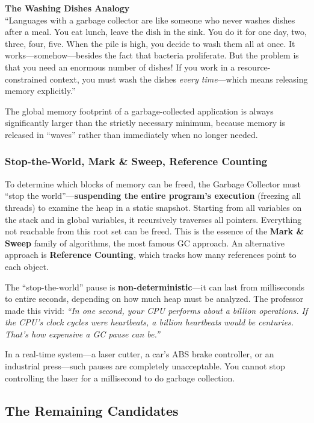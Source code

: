 \begin{insightbox}
\textbf{The Washing Dishes Analogy} \\
``Languages with a garbage collector are like someone who never washes dishes after a meal. You eat lunch, leave the dish in the sink. You do it for one day, two, three, four, five. When the pile is high, you decide to wash them all at once. It works---somehow---besides the fact that bacteria proliferate. But the problem is that you need an enormous number of dishes! If you work in a resource-constrained context, you must wash the dishes \emph{every time}---which means releasing memory explicitly.''
\end{insightbox}

The global memory footprint of a garbage-collected application is always significantly larger than the strictly necessary minimum, because memory is released in ``waves'' rather than immediately when no longer needed.

\subsubsection{Stop-the-World, Mark \& Sweep, Reference Counting}

To determine which blocks of memory can be freed, the Garbage Collector must ``stop the world''---\textbf{suspending the entire program's execution} (freezing all threads) to examine the heap in a static snapshot. Starting from all variables on the stack and in global variables, it recursively traverses all pointers. Everything not reachable from this root set can be freed. This is the essence of the \textbf{Mark \& Sweep} family of algorithms, the most famous GC approach. An alternative approach is \textbf{Reference Counting}, which tracks how many references point to each object.

The ``stop-the-world'' pause is \textbf{non-deterministic}---it can last from milliseconds to entire seconds, depending on how much heap must be analyzed. The professor made this vivid: \emph{``In one second, your CPU performs about a billion operations. If the CPU's clock cycles were heartbeats, a billion heartbeats would be centuries. That's how expensive a GC pause can be.''}

In a real-time system---a laser cutter, a car's ABS brake controller, or an industrial press---such pauses are completely unacceptable. You cannot stop controlling the laser for a millisecond to do garbage collection.

\subsection{The Remaining Candidates}

